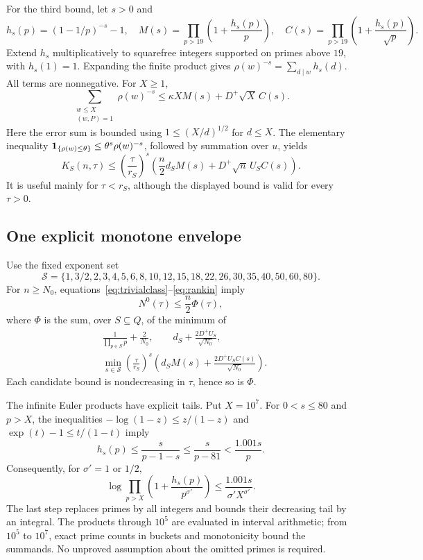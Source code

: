 For the third bound, let $s>0$ and
\[
 h_s(p)=(1-1/p)^{-s}-1,\quad
 M(s)=\prod_{p>19}\left(1+\frac{h_s(p)}p\right),\quad
 C(s)=\prod_{p>19}\left(1+\frac{h_s(p)}{\sqrt p}\right).
\]
Extend $h_s$ multiplicatively to squarefree integers supported on primes above $19$, with $h_s(1)=1$. Expanding the finite product gives
$\rho(w)^{-s}=\sum_{d\mid w}h_s(d)$.
All terms are nonnegative. For $X\ge1$,
\[
 \sum_{\substack{w\le X\\(w,P)=1}}\rho(w)^{-s}
 \le\kappa X M(s)+D^+\sqrt X\,C(s).
\]
Here the error sum is bounded using $1\le(X/d)^{1/2}$ for $d\le X$. The elementary inequality
$\mathbf 1_{\{\rho(w)\le\theta\}}\le\theta^s\rho(w)^{-s}$, followed by summation over $u$, yields
\begin{equation}\label{eq:rankin}
 K_S(n,\tau)\le
 \left(\frac\tau{r_S}\right)^s
 \left(\frac n2d_S M(s)+D^+\sqrt n\,U_S C(s)\right).
\end{equation}
It is useful mainly for $\tau<r_S$, although the displayed bound is valid for every $\tau>0$.

\subsection{One explicit monotone envelope}
Use the fixed exponent set
\[
\mathcal S=\{1,3/2,2,3,4,5,6,8,10,12,15,18,22,26,30,35,40,50,60,80\}.
\]
For $n\ge N_0$, equations~\eqref{eq:trivialclass}--\eqref{eq:rankin} imply
\begin{equation}\label{eq:envelope}
 N^0(\tau)\le\frac n2\Phi(\tau),
\end{equation}
where $\Phi$ is the sum, over $S\subseteq Q$, of the minimum of
\begin{align*}
 &\frac1{\prod_{p\in S}p}+\frac2{N_0},\qquad
 d_S+\frac{2D^+U_S}{\sqrt{N_0}},\\
 &\min_{s\in\mathcal S}\left(\frac\tau{r_S}\right)^s
       \left(d_SM(s)+\frac{2D^+U_SC(s)}{\sqrt{N_0}}\right).
\end{align*}
Each candidate bound is nondecreasing in $\tau$, hence so is $\Phi$.

The infinite Euler products have explicit tails. Put $X=10^7$. For $0<s\le80$ and $p>X$, the inequalities
$-\log(1-z)\le z/(1-z)$ and $\exp(t)-1\le t/(1-t)$ imply
\[
 h_s(p)\le\frac{s}{p-1-s}\le\frac{s}{p-81}<\frac{1.001s}{p}.
\]
Consequently, for $\sigma'=1$ or $1/2$,
\begin{equation}\label{eq:producttail}
 \log\prod_{p>X}\left(1+\frac{h_s(p)}{p^{\sigma'}}\right)
 \le \frac{1.001s}{\sigma'X^{\sigma'}}.
\end{equation}
The last step replaces primes by all integers and bounds their decreasing tail by an integral. The products through $10^5$ are evaluated in interval arithmetic; from $10^5$ to $10^7$, exact prime counts in buckets and monotonicity bound the summands. No unproved assumption about the omitted primes is required.

